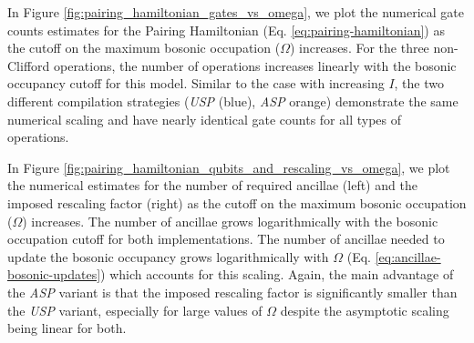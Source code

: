 In Figure \ref{fig:pairing_hamiltonian_gates_vs_omega}, we plot the numerical gate counts estimates for the Pairing Hamiltonian (Eq. \ref{eq:pairing-hamiltonian}) as the cutoff on the maximum bosonic occupation ($\Omega$) increases.
For the three non-Clifford operations, the number of operations increases linearly with the bosonic occupancy cutoff for this model.
Similar to the case with increasing $I$, the two different compilation strategies (\textit{USP} (blue), \textit{ASP} orange) demonstrate the same numerical scaling and have nearly identical gate counts for all types of operations.

In Figure \ref{fig:pairing_hamiltonian_qubits_and_rescaling_vs_omega}, we plot the numerical estimates for the number of required ancillae (left) and the imposed rescaling factor (right) as the cutoff on the maximum bosonic occupation ($\Omega$) increases.
The number of ancillae grows logarithmically with the bosonic occupation cutoff for both implementations.
The number of ancillae needed to update the bosonic occupancy grows logarithmically with $\Omega$ (Eq. \ref{eq:ancillae-bosonic-updates}) which accounts for this scaling.
Again, the main advantage of the \textit{ASP} variant is that the imposed rescaling factor is significantly smaller than the \textit{USP} variant, especially for large values of $\Omega$ despite the asymptotic scaling being linear for both.
